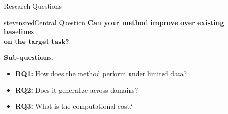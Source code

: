 \begin{frame}{Research Questions}

\begin{colorblock}[white]{stevensred}{Central Question}
\centering
\textbf{Can your method improve over existing baselines\\on the target task?}
\end{colorblock}

\vspace{0.5em}
\textbf{Sub-questions:}

\begin{itemize}
\item<2-> \textbf{RQ1:} How does the method perform under limited data?
\item<3-> \textbf{RQ2:} Does it generalize across domains?
\item<4-> \textbf{RQ3:} What is the computational cost?
\end{itemize}

\vspace{0.3em}
\end{frame}

